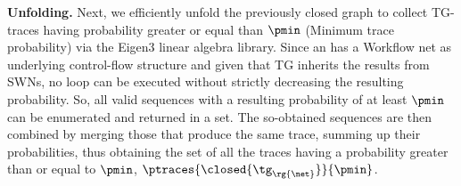 \textbf{Unfolding.} Next, we efficiently unfold the previously closed graph to collect TG-traces having probability greater or equal than $\pmin$ (\textsf{Minimum trace probability}) via the Eigen3 linear algebra library. %
Since an \uswn has a Workflow net as underlying control-flow structure and given that TG inherits the results from SWNs, no loop can be executed without strictly decreasing the resulting probability. So, all valid sequences with a resulting probability of at least $\pmin$ can be enumerated and returned in a set. The so-obtained sequences are then combined by merging those that produce the same trace, summing up their probabilities, thus obtaining the set of all the traces having a probability greater than or equal to $\pmin$, $\ptraces{\closed{\tg_{\rg{\net}}}}{\pmin}$. %

